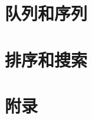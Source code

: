\documentclass[a4paper,twoside]{book} %
\begin{document}





\part{队列和序列}




\part{排序和搜索}




\part{附录}
\appendix
\noappendicestocpagenum
\addappheadtotoc





\printindex
\end{document}
